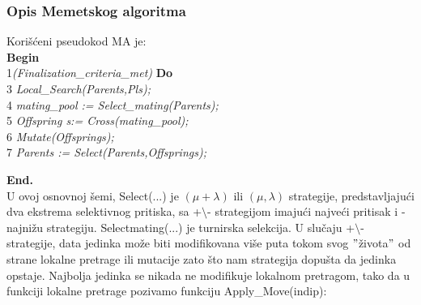 \documentclass[a4paper]{article}
\begin{document}
\subsubsection{Opis Memetskog algoritma }
\label{subsec:MA}

Korišćeni pseudokod MA je: \\

\textbf{Begin} \\
1\textit{(Finalization\_criteria\_met)} \textbf{Do} \\
3\hspace{1cm} \textit{Local\_Search(Parents,Pls); }\\
4\hspace{1cm} \textit{mating\_pool := Select\_mating(Parents);} \\
5\hspace{1cm} \textit{Offspring s:= Cross(mating\_pool);} \\
6\hspace{1cm} \textit{Mutate(Offsprings);} \\
7\hspace{1cm} \textit{Parents := Select(Parents,Offsprings);} 

\textbf{End.} \\

U ovoj osnovnoj šemi, Select(...) je $(\mu + \lambda)$ ili $(\mu,\lambda)$ strategije, predstavljajući dva ekstrema selektivnog pritiska, sa +$\setminus$- strategijom imajući najveći pritisak i - najnižu strategiju. Select\textunderscore mating(...) je turnirska selekcija. U slučaju +$\setminus$- strategije, data jedinka može biti modifikovana više puta tokom svog $"$života$"$ od strane lokalne pretrage ili mutacije zato što nam strategija dopušta da jedinka opstaje. Najbolja jedinka se nikada ne modifikuje lokalnom pretragom, tako da u funkciji lokalne pretrage pozivamo funkciju Apply\_Move(indip):\\
\end{document}
